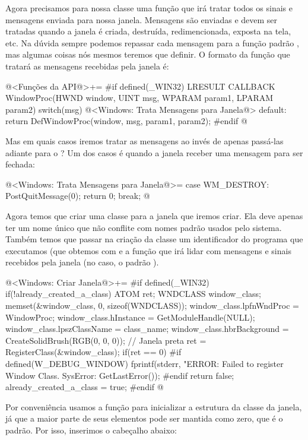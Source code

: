 Agora precisamos para nossa classe uma função que irá tratar todos os
sinais e mensagens enviada para nossa janela. Mensagens são enviadas e
devem ser tratadas quando a janela é criada, destruída,
redimencionada, exposta na tela, etc. Na dúvida sempre podemos
repassar cada mensagem para a função
padrão , mas algumas coisas nós mesmos
teremos que definir. O formato da função que tratará as mensagens
recebidas pela janela é:

\iniciocodigo
@<Funções da API@>+=
#if defined(_WIN32)
LRESULT CALLBACK WindowProc(HWND window, UINT msg, WPARAM param1, LPARAM param2){
  switch(msg){
    @<Windows: Trata Mensagens para Janela@>
    default:
      return DefWindowProc(window, msg, param1, param2);
  }
}
#endif
@
\fimcodigo

Mas em quais casos iremos tratar as mensagens ao invés de apenas
passá-las adiante para o ? Um dos casos é
quando a janela receber uma mensagem para ser fechada:

\iniciocodigo
@<Windows: Trata Mensagens para Janela@>=
case WM_DESTROY:
  PostQuitMessage(0);
  return 0;
  break;
@
\fimcodigo

Agora temos que criar uma classe para a janela que iremos criar. Ela
deve apenas ter um nome único que não conflite com nomes padrão usados
pelo sistema. Também temos que passar na criação da classe um
identificador do programa que executamos (que obtemos
com  e a função que irá lidar com
mensagens e sinais recebidos pela janela (no
caso, o padrão ).

\iniciocodigo
@<Windows: Criar Janela@>+=
#if defined(_WIN32)
if(!already_created_a_class){
  ATOM ret;
  WNDCLASS window_class;
  memset(&window_class, 0, sizeof(WNDCLASS));
  window_class.lpfnWndProc = WindowProc;
  window_class.hInstance = GetModuleHandle(NULL);
  window_class.lpszClassName = class_name;
  window_class.hbrBackground = CreateSolidBrush(RGB(0, 0, 0)); // Janela preta
  ret = RegisterClass(&window_class);
  if(ret == 0){
#if defined(W_DEBUG_WINDOW)
    fprintf(stderr, "ERROR: Failed to register Window Class. SysError: %
            GetLastError());
#endif
    return false;
  }
  already_created_a_class = true;
}
#endif
@
\fimcodigo

Por conveniência usamos a função  para inicializar
a estrutura da classe da janela, já que a maior parte de seus
elementos pode ser mantida como zero, que é o padrão. Por isso,
inserimos o cabeçalho abaixo:


